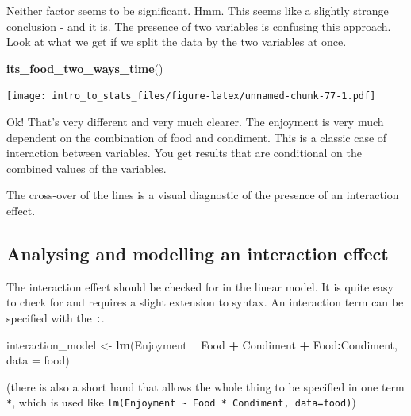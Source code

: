 \documentclass[
]{book}
\newenvironment{Shaded}{\begin{snugshade}}{\end{snugshade}}
\newcommand{\DataTypeTok}[1]{\textcolor[rgb]{0.13,0.29,0.53}{#1}}
\newcommand{\KeywordTok}[1]{\textcolor[rgb]{0.13,0.29,0.53}{\textbf{#1}}}
\newcommand{\NormalTok}[1]{#1}
\newcommand{\OperatorTok}[1]{\textcolor[rgb]{0.81,0.36,0.00}{\textbf{#1}}}
\newcommand{\StringTok}[1]{\textcolor[rgb]{0.31,0.60,0.02}{#1}}
\newenvironment{sidenote}
{ \begin{tcolorbox}[colbacktitle=blue!50!white,
title=huh?,coltitle=white,
fonttitle=\bfseries] }
{  \end{tcolorbox} }
\begin{document}
Neither factor seems to be significant. Hmm. This seems like a slightly strange conclusion - and it is. The presence of two variables is confusing this approach. Look at what we get if we split the data by the two variables at once.

\begin{Shaded}
\begin{Highlighting}[]
\KeywordTok{its_food_two_ways_time}\NormalTok{()}
\end{Highlighting}
\end{Shaded}

\texttt{[image: intro\_to\_stats\_files/figure-latex/unnamed-chunk-77-1.pdf]}

Ok! That's very different and very much clearer. The enjoyment is very much dependent on the combination of food and condiment. This is a classic case of interaction between variables. You get results that are conditional on the combined values of the variables.

\begin{sidenote}
The cross-over of the lines is a visual diagnostic of the presence of an interaction effect.
\end{sidenote}

\hypertarget{analysing-and-modelling-an-interaction-effect}{%
\subsection{Analysing and modelling an interaction effect}\label{analysing-and-modelling-an-interaction-effect}}

The interaction effect should be checked for in the linear model. It is quite easy to check for and requires a slight extension to syntax. An interaction term can be specified with the \texttt{:}.

\begin{Shaded}
\begin{Highlighting}[]
\NormalTok{interaction_model <-}\StringTok{ }\KeywordTok{lm}\NormalTok{(Enjoyment }\OperatorTok{~}\StringTok{ }\NormalTok{Food }\OperatorTok{+}\StringTok{ }\NormalTok{Condiment }\OperatorTok{+}\StringTok{ }\NormalTok{Food}\OperatorTok{:}\NormalTok{Condiment, }\DataTypeTok{data =}\NormalTok{ food)}
\end{Highlighting}
\end{Shaded}

(there is also a short hand that allows the whole thing to be specified in one term \texttt{*}, which is used like \texttt{lm(Enjoyment\ \textasciitilde{}\ Food\ *\ Condiment,\ data=food)})
\end{document}
